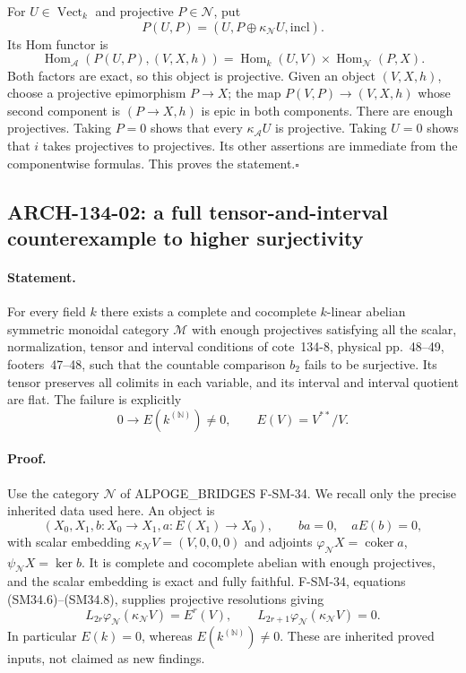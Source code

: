 For $U\in\operatorname{Vect}_k$ and projective $P\in\mathcal N$, put
\[
            P(U,P)=(U,P\oplus\kappa_{\mathcal N}U,\mathrm{incl}).
\]
Its Hom functor is
\[
 \operatorname{Hom}_{\mathcal A}(P(U,P),(V,X,h))
       =\operatorname{Hom}_k(U,V)\times\operatorname{Hom}_{\mathcal N}(P,X).
\]
Both factors are exact, so this object is projective.  Given an object
$(V,X,h)$, choose a projective epimorphism $P\to X$; the map
$P(V,P)\to(V,X,h)$ whose second component is $(P\to X,h)$ is epic
in both components.  There are enough projectives.  Taking $P=0$
shows that every $\kappa_{\mathcal A}U$ is projective.  Taking $U=0$
shows that $i$ takes projectives to projectives.  Its other assertions
are immediate from the componentwise formulas.  This proves the
statement.\hfill$\square$

\subsection{ARCH-134-02: a full tensor-and-interval counterexample to higher surjectivity}

\paragraph{Statement.}
For every field $k$ there exists a complete and cocomplete $k$-linear
abelian symmetric monoidal category $\mathcal M$ with enough projectives
satisfying all the scalar, normalization, tensor and interval conditions
of cote~134-8, physical pp.~48--49, footers~47--48, such that the
countable comparison $b_2$ fails to be surjective.  Its tensor preserves
all colimits in each variable, and its interval and interval quotient
are flat.  The failure is explicitly
\[
                      0\longrightarrow E(k^{(\mathbb N)})\ne0,
        \qquad E(V)=V^{**}/V.
 \tag{ARCH134.6}
\]

\paragraph{Proof.}
Use the category $\mathcal N$ of ALPOGE\_BRIDGES F-SM-34.  We recall
only the precise inherited data used here.  An object is
\[
 (X_0,X_1,b:X_0\to X_1,a:E(X_1)\to X_0),\qquad
              ba=0,\quad aE(b)=0,
\]
with scalar embedding $\kappa_{\mathcal N}V=(V,0,0,0)$ and adjoints
$\varphi_{\mathcal N}X=\operatorname{coker}a$,
$\psi_{\mathcal N}X=\ker b$.  It is complete and cocomplete abelian
with enough projectives, and the scalar embedding is exact and fully
faithful.  F-SM-34, equations (SM34.6)--(SM34.8), supplies projective
resolutions giving
\[
 L_{2r}\varphi_{\mathcal N}(\kappa_{\mathcal N}V)=E^r(V),
       \qquad L_{2r+1}\varphi_{\mathcal N}(\kappa_{\mathcal N}V)=0.
 \tag{ARCH134.7}
\]
In particular $E(k)=0$, whereas $E(k^{(\mathbb N)})\ne0$.
These are inherited proved inputs, not claimed as new findings.

